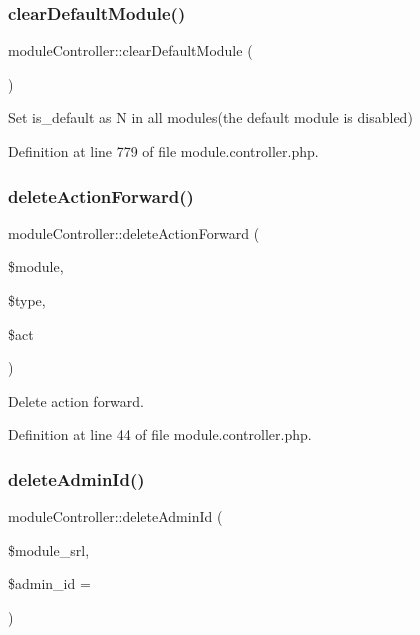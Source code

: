 \subsubsection{\texorpdfstring{clear\+Default\+Module()}{clearDefaultModule()}}
{\footnotesize\ttfamily module\+Controller\+::clear\+Default\+Module (\begin{DoxyParamCaption}{ }\end{DoxyParamCaption})}



Set is\+\_\+default as N in all modules(the default module is disabled) 



Definition at line 779 of file module.\+controller.\+php.

\mbox{\label{classmoduleController_ad256622e3b12acb2d96997315dc6fc45}} 
\subsubsection{\texorpdfstring{delete\+Action\+Forward()}{deleteActionForward()}}
{\footnotesize\ttfamily module\+Controller\+::delete\+Action\+Forward (\begin{DoxyParamCaption}\item[{}]{\$module,  }\item[{}]{\$type,  }\item[{}]{\$act }\end{DoxyParamCaption})}



Delete action forward. 



Definition at line 44 of file module.\+controller.\+php.

\mbox{\label{classmoduleController_a1a9115a9e85acd2b26229e36ba29daf4}} 
\subsubsection{\texorpdfstring{delete\+Admin\+Id()}{deleteAdminId()}}
{\footnotesize\ttfamily module\+Controller\+::delete\+Admin\+Id (\begin{DoxyParamCaption}\item[{}]{\$module\+\_\+srl,  }\item[{}]{\$admin\+\_\+id = {\ttfamily \textquotesingle{}\textquotesingle{}} }\end{DoxyParamCaption})}



